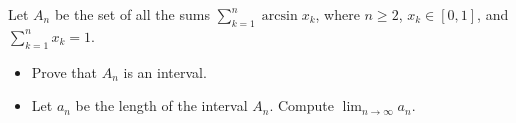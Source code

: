 Let \(A_n\) be the set of all the sums \(\sum_{k=1}^n \arcsin x_k\), where \(n\geq 2\), \(x_k \in [0,1]\), and \(\sum_{k=1}^n x_k = 1\).
\begin{itemize}
\item[(a)] Prove that \(A_n\) is an interval.
\item[(b)] Let \(a_n\) be the length of the interval  \(A_n\). Compute \(\displaystyle \lim_{n\to \infty} a_n\).
\end{itemize}
